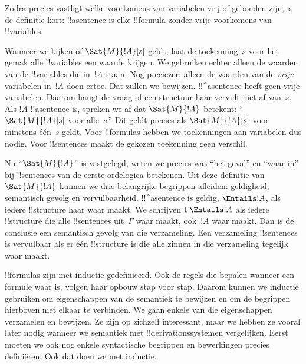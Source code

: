\documentclass[openany]{memoir}
\begin{document}
Zodra precies vastligt welke voorkomens van variabelen vrij of
gebonden zijn, is de definitie kort: !!a{sentence} is elke !!{formula}
zonder vrije voorkomens van !!{variable}s.
\endgroup

\begingroup
\def\olfilename{OLP-0145}
\def\olfilepath{content/first-order-logic/introduction/}
\hypertarget{unit-OLP-0145}{}





Wanneer we kijken of $\Sat{M}{!A}[s]$ geldt, laat de toekenning~$s$
voor het gemak alle !!{variable}s een waarde krijgen. We gebruiken
echter alleen de waarden van de !!{variable}s die in~$!A$ staan. Nog
preciezer: alleen de waarden van de \emph{vrije} variabelen in~$!A$
doen ertoe. Dat zullen we bewijzen. !!^a{sentence} heeft geen vrije
variabelen. Daarom hangt de vraag of een structuur haar vervult niet
af van~$s$. Als $!A$ !!a{sentence} is, spreken we af dat
$\Sat{M}{!A}$ betekent: ``$\Sat{M}{!A}[s]$ voor alle~$s$.'' Dit geldt
precies als $\Sat{M}{!A}[s]$ voor minstens één~$s$ geldt. Voor
!!{formula}s hebben we toekenningen aan variabelen dus nodig. Voor
!!{sentence}s maakt de gekozen toekenning geen verschil.

Nu ``$\Sat{M}{!A}$'' is vastgelegd, weten we precies wat ``het geval''
en ``waar in'' bij !!{sentence}s van de eerste-ordelogica betekenen.
Uit deze definitie van $\Sat{M}{!A}$ kunnen we drie belangrijke
begrippen afleiden: geldigheid, semantisch gevolg en vervulbaarheid. !!^a{sentence} is geldig,
$\Entails !A$, als iedere !!{structure} haar waar maakt. We schrijven
$\Gamma \Entails !A$ als iedere !!{structure} die alle !!{sentence}s
uit~$\Gamma$ waar maakt, ook~$!A$ waar maakt. Dan is de conclusie een
semantisch gevolg van die verzameling. Een verzameling !!{sentence}s is
vervulbaar als er één !!{structure} is die alle zinnen in die
verzameling tegelijk waar maakt.

!!{formula}s zijn met inductie gedefinieerd. Ook de regels die bepalen
wanneer een formule waar is, volgen haar opbouw stap voor stap. Daarom
kunnen we inductie gebruiken om eigenschappen van de semantiek te
bewijzen en om de begrippen hierboven met elkaar te verbinden. We gaan
enkele van die eigenschappen verzamelen en bewijzen. Ze zijn op zichzelf interessant,
maar we hebben ze vooral later nodig wanneer we semantiek met
!!{derivation}ssystemen vergelijken. Eerst moeten we ook nog enkele
syntactische begrippen en bewerkingen precies definiëren. Ook dat doen
we met inductie.
\endgroup
\end{document}
